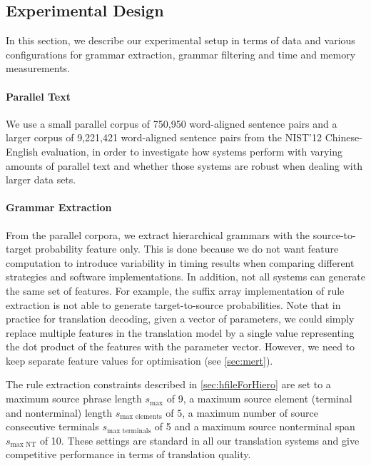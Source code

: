 \subsection{Experimental Design}

In this section, we describe our experimental setup in terms of data and various
configurations for grammar extraction, grammar filtering and
time and memory measurements.
%
\paragraph{Parallel Text} We use a small parallel corpus of 750,950 word-aligned sentence
    pairs and a larger corpus of 9,221,421 word-aligned sentence pairs from the
    NIST'12 Chinese-English evaluation, in order to investigate how systems perform %
    with varying amounts of parallel text and whether those systems are robust
    when dealing with larger data sets.
%
\paragraph{Grammar Extraction} From the parallel corpora, we extract hierarchical
    grammars with the source-to-target probability feature only. This is done
    because we do
    not want feature computation to introduce variability in timing results when
    comparing different strategies and software implementations. In addition, not
    all systems can generate the same set of features. For example,
    the suffix array implementation of rule extraction is not able to generate
    target-to-source probabilities. Note that in practice for
    translation decoding, given a vector of
    parameters, we could simply replace multiple features in the translation
    model by a single value representing the dot product of the features with
    the parameter vector. However, we need to keep separate feature values for
    optimisation (see \autoref{sec:mert}).

    The rule extraction constraints described in \autoref{sec:hfileForHiero}
    are set to a maximum source phrase length $s_{\text{max}}$ of 9, a maximum
    source element (terminal and nonterminal) length $s_{\text{max elements}}$
    of 5, a maximum number of source consecutive terminals $s_{\text{max terminals}}$
    of 5 and a maximum source nonterminal span $s_{\text{max NT}}$ of 10. These
    settings are standard in all our translation systems and give competitive
    performance in terms of translation quality.

